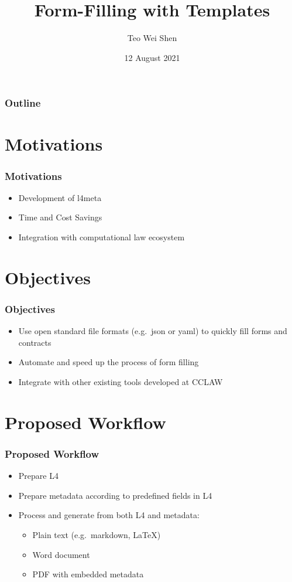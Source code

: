 \documentclass{beamer}
\title{Form-Filling with Templates}
\author{Teo Wei Shen}
\date{12 August 2021}
\begin{document}
\frame{\titlepage}

\begin{frame}
    \frametitle{Outline}
    \tableofcontents
\end{frame}

\section{Motivations}
\begin{frame}
\frametitle{Motivations}
    \begin{itemize}
    \item Development of l4meta
    \item Time and Cost Savings
    \item Integration with computational law ecosystem
    \end{itemize}
\end{frame}

\section{Objectives}
\begin{frame}
\frametitle{Objectives}
    \begin{itemize}
    \item Use open standard file formats (e.g.\ json or yaml) to quickly fill forms and contracts
    \item Automate and speed up the process of form filling
    \item Integrate with other existing tools developed at CCLAW
    \end{itemize}
\end{frame}

\section{Proposed Workflow}
\begin{frame}
\frametitle{Proposed Workflow}
    \begin{itemize}
    \item Prepare L4
    \item Prepare metadata according to predefined fields in L4
    \item Process and generate from both L4 and metadata:
        \begin{itemize}
        \item Plain text (e.g.\ markdown, LaTeX)
        \item Word document
        \item PDF with embedded metadata
        \end{itemize}
    \end{itemize}
\end{frame}
\end{document}

